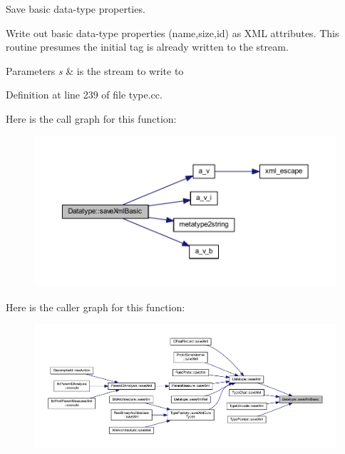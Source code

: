 Save basic data-\/type properties. 

Write out basic data-\/type properties (name,size,id) as X\+ML attributes. This routine presumes the initial tag is already written to the stream. 
\begin{DoxyParams}{Parameters}
{\em s} & is the stream to write to \\
\hline
\end{DoxyParams}


Definition at line 239 of file type.\+cc.

Here is the call graph for this function\+:
\nopagebreak
\begin{figure}[H]
\begin{center}
\leavevmode
\includegraphics[width=350pt]{class_datatype_a27dc7495a59adaca34b83366a963fd45_cgraph}
\end{center}
\end{figure}
Here is the caller graph for this function\+:
\nopagebreak
\begin{figure}[H]
\begin{center}
\leavevmode
\includegraphics[width=350pt]{class_datatype_a27dc7495a59adaca34b83366a963fd45_icgraph}
\end{center}
\end{figure}
\mbox{\label{class_datatype_aa29b0b69af8ed3be7dc573e4a1e355a5}} 
